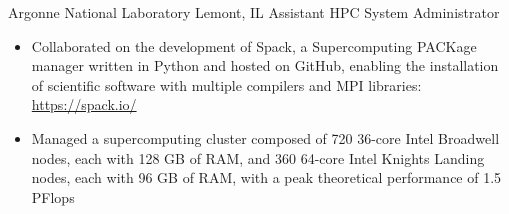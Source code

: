 
        {Argonne National Laboratory}
        {Lemont, IL}
        {Assistant HPC System Administrator}
        {}{
    \begin{itemize}
        \item Collaborated on the development of Spack, a Supercomputing PACKage manager written
            in Python and hosted on GitHub, enabling the installation of scientific software with multiple compilers and MPI libraries: \url{https://spack.io/}
        \item Managed a supercomputing cluster composed of 720 36-core Intel Broadwell nodes,
            each with 128 GB of RAM, and 360 64-core Intel Knights Landing nodes, each with
            96 GB of RAM, with a peak theoretical performance of 1.5 PFlops
    \end{itemize}
}
